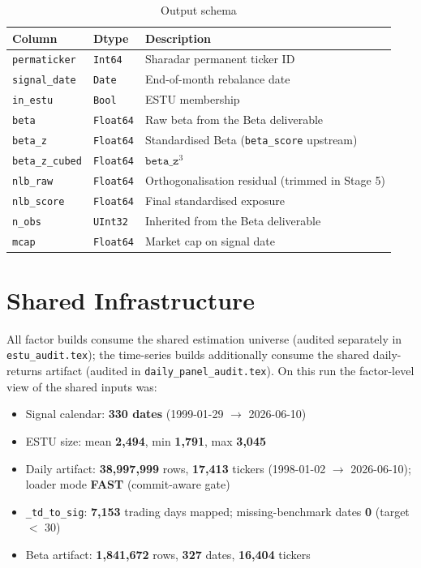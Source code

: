 \documentclass[11pt,a4paper]{article}
\begin{document}
\begin{table}[h!]
\centering
\caption{Output schema}
\begin{tabular}{llp{7.4cm}}
\toprule
\textbf{Column} & \textbf{Dtype} & \textbf{Description} \\
\midrule
\texttt{permaticker} & \texttt{Int64} & Sharadar permanent ticker ID \\
\texttt{signal\_date} & \texttt{Date} & End-of-month rebalance date \\
\texttt{in\_estu} & \texttt{Bool} & ESTU membership \\
\texttt{beta} & \texttt{Float64} & Raw beta from the Beta deliverable \\
\texttt{beta\_z} & \texttt{Float64} & Standardised Beta (\texttt{beta\_score} upstream) \\
\texttt{beta\_z\_cubed} & \texttt{Float64} & $\texttt{beta\_z}^{3}$ \\
\texttt{nlb\_raw} & \texttt{Float64} & Orthogonalisation residual (trimmed in Stage 5) \\
\texttt{nlb\_score} & \texttt{Float64} & Final standardised exposure \\
\texttt{n\_obs} & \texttt{UInt32} & Inherited from the Beta deliverable \\
\texttt{mcap} & \texttt{Float64} & Market cap on signal date \\
\bottomrule
\end{tabular}
\end{table}

\section{Shared Infrastructure}

All factor builds consume the shared estimation universe
 (audited separately in
\texttt{estu\_audit.tex}); the time-series builds additionally consume the
shared daily-returns artifact (audited in \texttt{daily\_panel\_audit.tex}).
On this run the factor-level view of the shared inputs was:

\begin{itemize}[leftmargin=*,topsep=2pt,itemsep=2pt]
  \item Signal calendar: \textbf{330 dates} (1999-01-29 $\to$ 2026-06-10)
  \item ESTU size: mean \textbf{2{,}494}, min \textbf{1{,}791}, max \textbf{3{,}045}
  \item Daily artifact: \textbf{38{,}997{,}999} rows, \textbf{17{,}413} tickers (1998-01-02 $\to$ 2026-06-10); loader mode \textbf{FAST} (commit-aware gate)
  \item \texttt{\_td\_to\_sig}: \textbf{7{,}153} trading days mapped; missing-benchmark dates \textbf{0} (target $<$ 30)
  \item Beta artifact: \textbf{1{,}841{,}672} rows, \textbf{327} dates, \textbf{16{,}404} tickers
\end{itemize}
\end{document}
